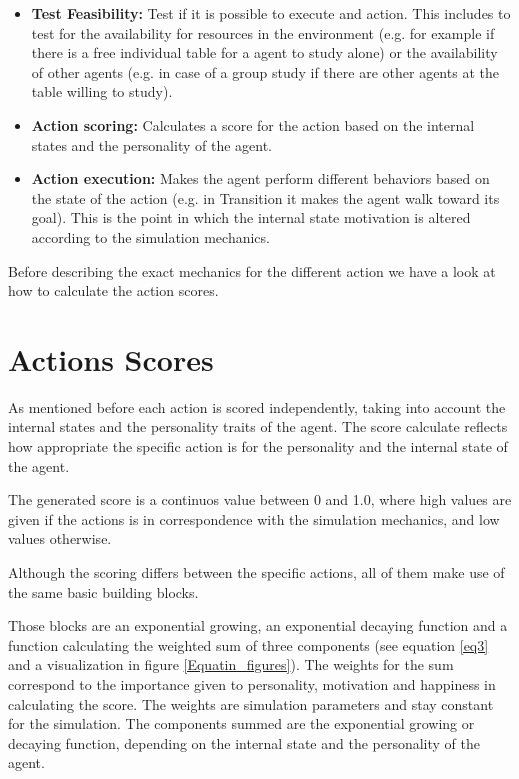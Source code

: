 \begin{itemize}
    \item \textbf{Test Feasibility:} Test if it is possible to execute and action. This
    includes to test for the availability for resources in the environment
    (e.g. for example if there is a free individual table for a agent to study alone)
    or the availability of other agents (e.g. in case of a group study if there are
    other agents at the table willing to study).
    \item \textbf{Action scoring:} Calculates a score for the action based on the
    internal states and the personality of the agent.
    \item \textbf{Action execution:} Makes the agent perform different behaviors
    based on the state of the action (e.g. in Transition it makes the agent walk toward its goal).
    This is the point in which the internal state motivation is altered according
    to the simulation mechanics.
\end{itemize}

Before describing the exact mechanics for the different action we have a look at
how to calculate the action scores.


\pagebreak
\label{action-scores}
\section{Actions Scores}
As mentioned before each action is scored independently, taking into account the
internal states and the personality traits of the agent. The score calculate reflects
how appropriate the specific action is for the personality and the internal state
of the agent.

The generated score is a continuos value between 0 and 1.0, where high values
are given if the actions is in correspondence with the simulation mechanics, and
low values otherwise.

Although the scoring differs between the specific actions, all of them make use
of the same basic building blocks.

\bb

Those blocks are an exponential growing, an exponential decaying function and a
function calculating the weighted sum of three components (see equation \ref{eq3}
and a visualization in figure \ref{Equatin_figures}). The weights for the sum correspond
to the importance given to personality, motivation and happiness in calculating the score.
The weights are simulation parameters and stay constant for the simulation. The components summed
are the exponential growing or decaying function, depending on the internal state
and the personality of the agent.

